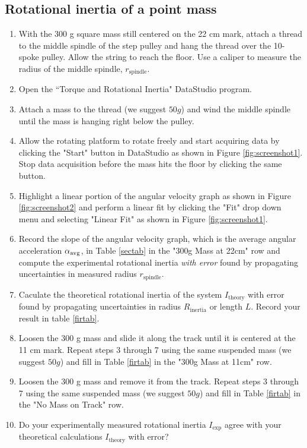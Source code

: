 \subsection{Rotational inertia of a point mass}
\label{pointmass}
\begin{enumerate}
	\item With the 300 g square mass still centered on the 22 cm mark, attach a thread to the middle spindle of the step pulley and hang the thread over the 10-spoke pulley.  Allow the string to reach the floor.  Use a caliper to measure the radius of the middle spindle, $r_\text{spindle}$.
	\item Open the ``Torque and Rotational Inertia" DataStudio program.  
	\item Attach a mass to the thread (we suggest $50g$) and wind the middle spindle until the mass is hanging right below the pulley.
	\item Allow the rotating platform to rotate freely and start acquiring data by clicking the "Start" button in DataStudio as shown in Figure \ref{fig:screenshot1}. Stop data acquisition before the mass hits the floor by clicking the same button.
	\item Highlight a linear portion of the angular velocity graph as shown in Figure \ref{fig:screenshot2} and perform a linear fit by clicking the "Fit" drop down menu and selecting "Linear Fit" as shown in Figure \ref{fig:screenshot1}.
	\item Record the slope of the angular velocity graph, which is the average angular acceleration $\alpha _{\rm avg}$, in Table \ref{sectab} in the "300g Mass at 22cm" row and compute the experimental rotational inertia {\it{with error}} found by propagating uncertainties in measured radius $r_\text{spindle}$.
\item Caculate the theoretical rotational inertia of the system $I_\text{theory}$ with error found by propagating uncertainties in radius $R_\text{inertia}$ or length $L$. Record your result in table \ref{firtab}.
	\item Loosen the 300 g mass and slide it along the track until it is centered at the 11 cm mark.  Repeat steps 3 through 7 using the same suspended mass (we suggest $50g$) and fill in Table \ref{firtab} in the "300g Mass at 11cm" row.
	\item Loosen the 300 g mass and remove it from the track.  Repeat steps 3 through 7 using the same suspended mass (we suggest $50g$) and fill in Table \ref{firtab} in the "No Mass on Track" row.
	\item Do your experimentally measured rotational inertia $I_\text{exp}$ agree with your theoretical calculations $I_\text{theory}$ with error? 

\end{enumerate}

